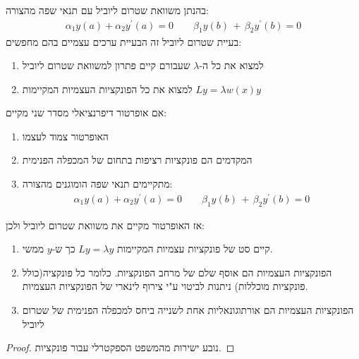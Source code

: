 \documentclass{tstextbook}
\begin{document}
\begin{definition}
בהנתן משוואת שטרום ליוביל עם תנאי שפה מהצורה:
$$\begin{array}{c}{{\alpha_{1}y(a)+\alpha_{2}y^{\prime}(a)=0}}\qquad {{\beta_{1}y(b)\,+\,\beta_{2}y^{\prime}(b)=0}}\end{array}$$
בעיית שטרום ליוביל זה הבעיית ערכים עצמיים בהם מחפשים:

  \begin{enumerate}
    \item למצוא את כל ה-\(\lambda\) שעבורם קיים פתרון למשוואת שטרום ליוביל 


    \item למצוא את כל הפונקציות העצמיות המקיימות \(Ly=\lambda w(x)y\)


  \end{enumerate}
\end{definition}
\begin{theorem}
אם אופרטור דיפרנציאלי מסדר שני מקיים:

  \begin{enumerate}
    \item האופרטור צמוד לעצמו 


    \item המקדמים הם פונקציות רציפות בתחום של המכפלה הפנימית 


    \item מתקיימים תנאי שפה הומוגנים מהצורה: 
$$\begin{array}{c}{{\alpha_{1}y(a)+\alpha_{2}y^{\prime}(a)=0}}\qquad {{\beta_{1}y(b)\,+\,\beta_{2}y^{\prime}(b)=0}}\end{array}$$


  \end{enumerate}
אז האופרטור מקיים את משוואת שטרום ליוביל ולכן:

  \begin{enumerate}
    \item קיים סט של פונקציות עצמיות המקיימות \(Ly = \lambda y\) כך ש-\(y\) ממשי. 


    \item הפונקציות העצמיות הם אוסף שלם של מרחב הפונקציות. כלומר כל פונקציה(כולל פונקציות מוכללות) ניתנות לביטוי ע"י צירוף לינארי של הפונקציות העצמיות. 


    \item הפונקציות העצמיות הם אורתוגונאליות אחת לשנייה ביחס למכפלה הפנימית של שטרום ליוביל 


  \end{enumerate}
\end{theorem}
\begin{proof}
נובע ישירות מהמשפט הספקטרלי עבור פונקציות.

\end{proof}
\end{document}
